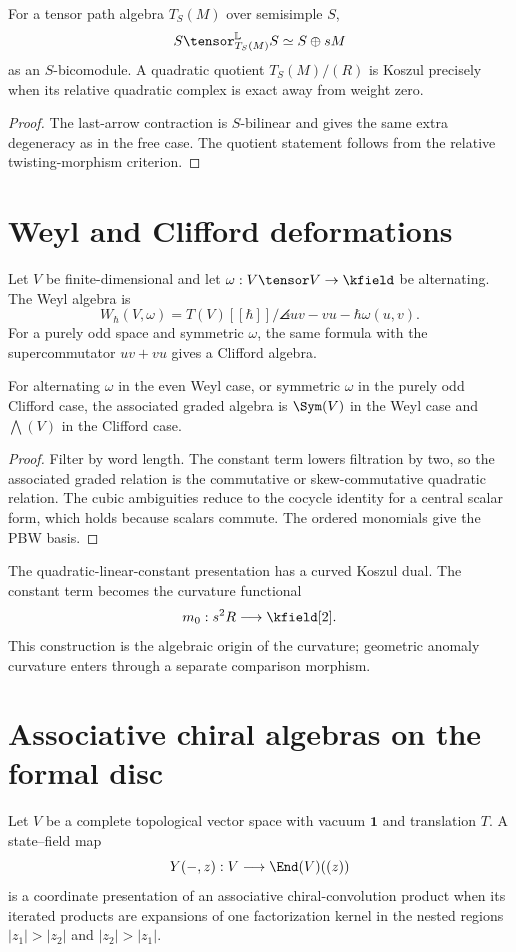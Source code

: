 \begin{theorem}
For a tensor path algebra $T_S(M)$ over semisimple $S$,
\[
 S\tensor_{T_S(M)}^{\mathbb L}S\simeq S\oplus sM
\]
as an $S$-bicomodule. A quadratic quotient $T_S(M)/(R)$ is Koszul precisely when its relative quadratic complex is exact away from weight zero.
\end{theorem}
\begin{proof}
The last-arrow contraction is $S$-bilinear and gives the same extra degeneracy as in the free case. The quotient statement follows from the relative twisting-morphism criterion.
\end{proof}

\chapter{Weyl and Clifford deformations}
Let $V$ be finite-dimensional and let $\omega:V\tensor V\to\kfield$ be alternating. The Weyl algebra is
\[
 W_\hbar(V,\omega)=T(V)[[\hbar]]/
 \angles{uv-vu-\hbar\omega(u,v)}.
\]
For a purely odd space and symmetric $\omega$, the same formula with the supercommutator $uv+vu$ gives a Clifford algebra.

\begin{theorem}
For alternating $\omega$ in the even Weyl case, or symmetric $\omega$ in the purely odd Clifford case, the associated graded algebra is $\Sym(V)$ in the Weyl case and $\bigwedge(V)$ in the Clifford case.
\end{theorem}
\begin{proof}
Filter by word length. The constant term lowers filtration by two, so the associated graded relation is the commutative or skew-commutative quadratic relation. The cubic ambiguities reduce to the cocycle identity for a central scalar form, which holds because scalars commute. The ordered monomials give the PBW basis.
\end{proof}

The quadratic-linear-constant presentation has a curved Koszul dual. The constant term becomes the curvature functional
\[
 m_0:s^2R\longrightarrow\kfield[2].
\]
This construction is the algebraic origin of the curvature; geometric anomaly curvature enters through a separate comparison morphism.


\chapter{Associative chiral algebras on the formal disc}
Let $V$ be a complete topological vector space with vacuum $\mathbf1$ and translation $T$.  A state--field map
\[
 Y(-,z):V\longrightarrow\End(V)((z))
\]
is a coordinate presentation of an associative chiral-convolution product when its iterated products are expansions of one factorization kernel in the nested regions $|z_1|>|z_2|$ and $|z_2|>|z_1|$.

